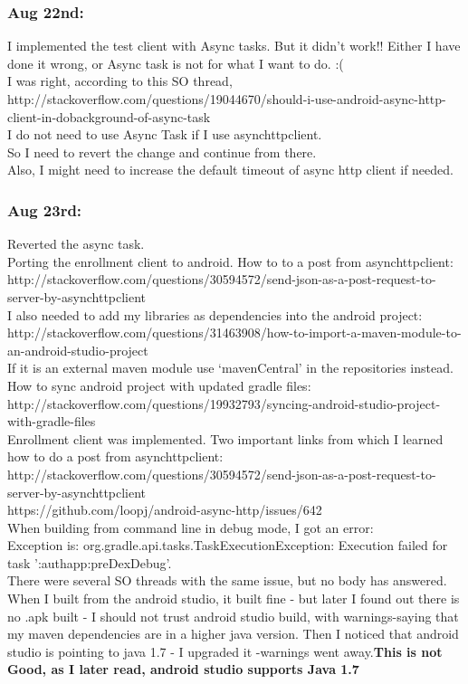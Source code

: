 \documentclass[11pt]{article}
\begin{document}
\subsubsection*{Aug 22nd:}
I implemented the test client with Async tasks. But it didn't work!! Either I have done it wrong, or Async task is not for what I want to do. :(\\
I was right, according to this SO thread, \\
http://stackoverflow.com/questions/19044670/should-i-use-android-async-http-client-in-dobackground-of-async-task\\
I do not need to use Async Task if I use asynchttpclient.\\
So I need to revert the change and continue from there.\\
Also, I might need to increase the default timeout of async http client if needed.\\

\subsubsection*{Aug 23rd:}
Reverted the async task.\\
Porting the enrollment client to android. How to to a post from asynchttpclient: 
http://stackoverflow.com/questions/30594572/send-json-as-a-post-request-to-server-by-asynchttpclient\\
I also needed to add my libraries as dependencies into the android project: 
http://stackoverflow.com/questions/31463908/how-to-import-a-maven-module-to-an-android-studio-project\\
If it is an external maven module use `mavenCentral' in the repositories instead.\\
How to sync android project with updated gradle files: http://stackoverflow.com/questions/19932793/syncing-android-studio-project-with-gradle-files\\

Enrollment client was implemented. Two important links from which I learned how to do a post from asynchttpclient:\\
http://stackoverflow.com/questions/30594572/send-json-as-a-post-request-to-server-by-asynchttpclient\\
https://github.com/loopj/android-async-http/issues/642\\

When building from command line in debug mode, I got an error: \\
Exception is: org.gradle.api.tasks.TaskExecutionException: Execution failed for task ':authapp:preDexDebug'.\\
There were several SO threads with the same issue, but no body has answered.\\
When I built from the android studio, it built fine - but later I found out there is no .apk built - I should not trust android studio build, with 
warnings-saying that my maven dependencies are in a higher java version. 
Then I noticed that android studio is pointing to java 1.7 - I upgraded it -warnings went away.\textbf{This is not Good, as I later read, android 
studio supports Java 1.7}\\
\end{document}

